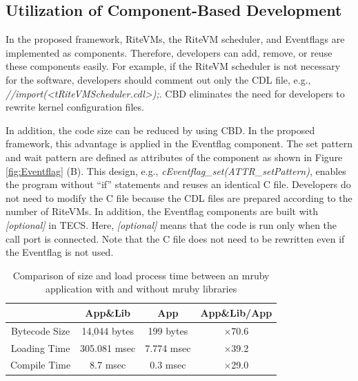 \documentclass[S,R,E]{article/compsoft}
\begin{document}
 
\subsection{Utilization of Component-Based Development}
In the proposed framework, RiteVMs, the RiteVM scheduler, and Eventflags are implemented as components.
Therefore, developers can add, remove, or reuse these components easily.
For example, if the RiteVM scheduler is not necessary for the software, developers should comment out only the CDL file, e.g., {\it //import(<tRiteVMScheduler.cdl>);}.
CBD eliminates the need for developers to rewrite kernel configuration files.

In addition, the code size can be reduced by using CBD. 
In the proposed framework, this advantage is applied in the Eventflag component.
The set pattern and wait pattern are defined as attributes of the component as shown in Figure \ref{fig:Eventflag} (B).
This design, e.g., {\it cEventflag\_set(ATTR\_setPattern)}, enables the program without ``if'' statements and reuses an identical C file.
Developers do not need to modify the C file because the CDL files are prepared according to the number of RiteVMs.
In addition, the Eventflag components are built with {\it [optional]} in TECS.
Here, {\it [optional]} means that the code is run only when the call port is connected.
Note that the C file does not need to be rewritten even if the Eventflag is not used. 


\begin{table}[t]
    \centering
\caption{Comparison of size and load process time between an mruby application with and without mruby libraries}
    \scriptsize
    {\tabcolsep=0.1cm
    \begin{tabular}{c||c|c|c}
                        & App\&Lib     & App        &   App\&Lib/App  \\ \hline
        Bytecode Size   & 14,044 bytes & 199 bytes  &   $\times$70.6          \\ %
        Loading Time    & 305.081 msec & 7.774 msec &   $\times$39.2          \\
        Compile Time    & 8.7 msec     & 0.3 msec   &   $\times$29.0          \\
    \end{tabular}
    }
    \label{tab:size_and_time}
\end{table}
\end{document}
